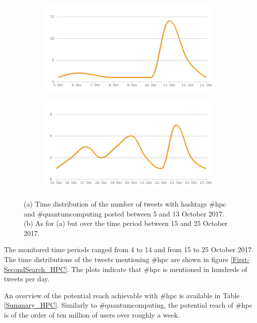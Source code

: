 \begin{figure}
 \centering
 \begin{subfigure}[b]{0.9\textwidth}
   \includegraphics[width=1\linewidth]{Images/FirstSearch_HPC-QuantumComputing.png}
   \caption{} 
 \end{subfigure}

 \begin{subfigure}[b]{0.9\textwidth}
   \includegraphics[width=1\linewidth]{Images/SecondSearch_HPC-QuantumComputing.png}
   \caption{}
 \end{subfigure}
 \caption{(a) Time distribution of the number of tweets with hashtags \#hpc and \#quantumcomputing posted between 5 and 13 October 2017. (b) As for (a) but over the time period between 15 and 25 October 2017.} 
 \label{First-SecondSearch_HPC-QuantumComputing}
\end{figure}

The monitored time periods ranged from 4 to 14 and from 15 to 25 October 2017. The time distributions of the tweets mentioning \#hpc are shown in figure \ref{First-SecondSearch_HPC}. The plots indicate that \#hpc is mentioned in hundreds of tweets per day.

An overview of the potential reach achievable with \#hpc is available in Table \ref{Summary_HPC}. Similarly to \#quantumcomputing, the potential reach of \#hpc is of the order of ten million of users over roughly a week. 

